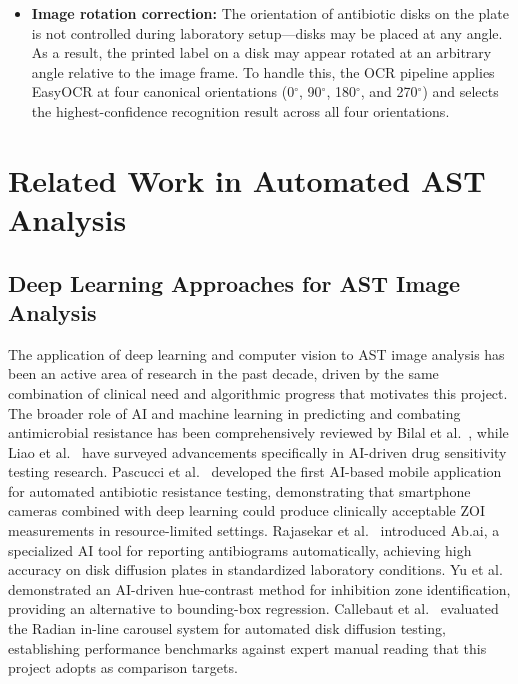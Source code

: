 \begin{itemize}
  \item \textbf{Image rotation correction:} The orientation of antibiotic disks on the plate
        is not controlled during laboratory setup---disks may be placed at any angle. As a
        result, the printed label on a disk may appear rotated at an arbitrary angle relative
        to the image frame. To handle this, the OCR pipeline applies EasyOCR at four canonical
        orientations (0$^\circ$, 90$^\circ$, 180$^\circ$, and 270$^\circ$) and selects the
        highest-confidence recognition result across all four orientations.
\end{itemize}

\section{Related Work in Automated AST Analysis}

\subsection{Deep Learning Approaches for AST Image Analysis}

The application of deep learning and computer vision to AST image analysis has been an active
area of research in the past decade, driven by the same combination of clinical need and
algorithmic progress that motivates this project. The broader role of AI and machine learning
in predicting and combating antimicrobial resistance has been comprehensively reviewed by
Bilal et al.\ \cite{bilal2025}, while Liao et al.\ \cite{liao2025} have surveyed advancements
specifically in AI-driven drug sensitivity testing research.
Pascucci et al.\ \cite{pascucci2021,pascucci2020preprint} developed the first AI-based mobile
application for automated antibiotic resistance testing, demonstrating that smartphone cameras
combined with deep learning could produce clinically acceptable ZOI measurements in
resource-limited settings.
Rajasekar et al.\ \cite{rajasekar2022} introduced Ab.ai, a specialized AI tool for reporting
antibiograms automatically, achieving high accuracy on disk diffusion plates in standardized
laboratory conditions.
Yu et al.\ \cite{yu2025} demonstrated an AI-driven hue-contrast method for inhibition zone
identification, providing an alternative to bounding-box regression.
Callebaut et al.\ \cite{callebaut2024} evaluated the Radian\textregistered{} in-line carousel
system for automated disk diffusion testing, establishing performance benchmarks
against expert manual reading that this project adopts as comparison targets.

